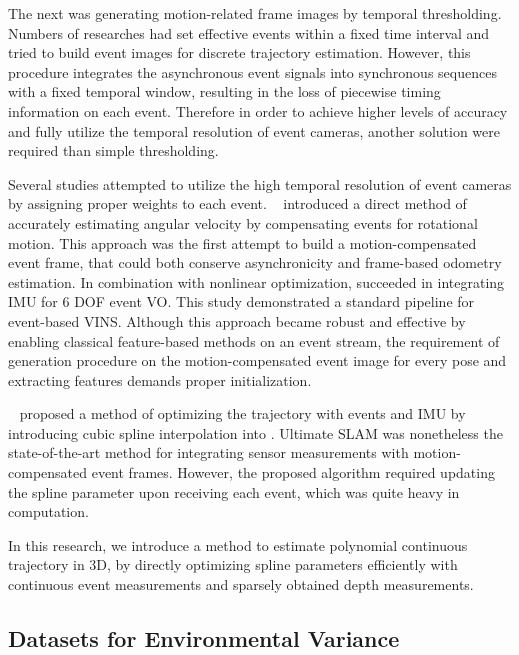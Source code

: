 The next was generating motion-related frame images by temporal thresholding. Numbers of researches had set effective events within a fixed time interval and tried to build event images for discrete trajectory estimation. However, this procedure integrates the asynchronous event signals into synchronous sequences with a fixed temporal window, resulting in the loss of piecewise timing information on each event. Therefore in order to achieve higher levels of accuracy and fully utilize the temporal resolution of event cameras, another solution were required than simple thresholding.

Several studies attempted to utilize the high temporal resolution of event cameras by assigning proper weights to each event. \citeauthor{gallego2017accurate}~\cite{gallego2017accurate} introduced a direct method of accurately estimating angular velocity by compensating events for rotational motion. This approach was the first attempt to build a motion-compensated event frame, that could both conserve asynchronicity and frame-based odometry estimation. In combination with nonlinear optimization, \cite{rebecq2017real} succeeded in integrating \ac{IMU} for 6 \ac{DOF} event \ac{VO}. This study demonstrated a standard pipeline for event-based \ac{VINS}. Although this approach became robust and effective by enabling classical feature-based methods on an event stream, the requirement of generation procedure on the motion-compensated event image for every pose and extracting features demands proper initialization.

\citeauthor{mueggler2018continuous}~\cite{mueggler2018continuous} proposed a method of optimizing the trajectory with events and \ac{IMU} by introducing cubic spline interpolation into \cite{rebecq2017evo}. Ultimate SLAM \cite{vidal2018ultimate} was nonetheless the state-of-the-art method for integrating sensor measurements with motion-compensated event frames. However, the proposed algorithm required updating the spline parameter upon receiving each event, which was quite heavy in computation.

In this research, we introduce a method to estimate polynomial continuous trajectory in 3D,
by directly optimizing spline parameters efficiently with continuous event measurements and
sparsely obtained depth measurements.

\subsection{Datasets for Environmental Variance}

